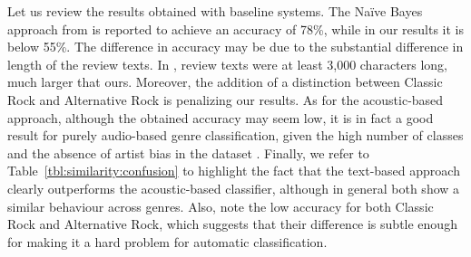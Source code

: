 
Let us review the results obtained with baseline systems. The Na\"{i}ve Bayes approach from \cite{Hu2005} is reported to achieve an accuracy of 78\%, while in our results it is below 55\%. The difference in accuracy may be due to the substantial difference in length of the review texts. In \cite{Hu2005}, review texts were at least 3,000 characters long, much larger that ours. Moreover, the addition of a distinction between Classic Rock and Alternative Rock is penalizing our results. 
As for the acoustic-based approach, although the obtained accuracy may seem low, it is in fact a good result for purely audio-based genre classification, given the high number of classes and the absence of artist bias in the dataset \cite{bogdanov2016cross}.
Finally, we refer to Table~\ref{tbl:similarity:confusion} to highlight the fact that the text-based approach clearly outperforms the acoustic-based classifier, although in general both show a similar behaviour across genres. Also, note the low accuracy for both Classic Rock and Alternative Rock, which suggests that their difference is subtle enough for making it a hard problem for automatic classification.

